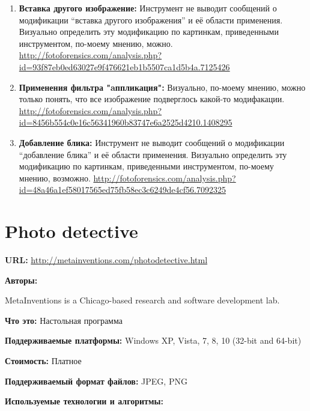 \begin{enumerate}
\item \textbf{Вставка другого изображение:}
Инструмент не выводит сообщений о модификации “вставка другого изображения” и её области применения. Визуально определить эту модификацию по картинкам, приведенными инструментом, по-моему мнению, можно.
\url{http://fotoforensics.com/analysis.php?id=93f87eb0ed63027e9f476621eb1b5507ca1d5b4a.7125426}

\item \textbf{Применения фильтра "aппликация":}
Визуально, по-моему мнению, можно только понять, что все изображение подверглось какой-то модифакации. 
\url{http://fotoforensics.com/analysis.php?id=8456b554c0e16c56341960b83747e6a2525d4210.1408295}

\item \textbf{Добавление блика:}
Инструмент не выводит сообщений о модификации “добавление блика” и её области применения. Визуально определить эту модификацию по картинкам, приведенными инструментом, по-моему мнению, возможно.
\url{http://fotoforensics.com/analysis.php?id=48a46a1ef58017565ed75fb58ec3c6249de4cf56.7092325}

\end{enumerate}

\newpage

\section{Photo detective}

\textbf{URL: } \url{http://metainventions.com/photodetective.html}

\textbf{Авторы:}

MetaInventions is a Chicago-based research and software development lab.

\textbf{Что это:} Настольная программа

\textbf{Поддерживаемые платформы:} Windows XP, Vista, 7, 8, 10 (32-bit and 64-bit)

\textbf{Стоимость:} Платное

\textbf{Поддерживаемый формат файлов:} JPEG, PNG

\textbf{Используемые технологии и алгоритмы:}

